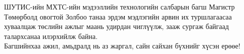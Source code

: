 
\begin{acknowledgements}
\addchaptertocentry{\acknowledgementname}

ШУТИС-ийн МХТС-ийн мэдээллийн технологийн салбарын багш Магистр Төмөрболд овогтой Золбоо танаа эрдэм мэдлэгийн арвин их туршлагаасаа хуваалцаж төслийн ажлыг маань удирдан чиглүүлж, зааж сургаж байгаад талархсанаа илэрхийлж байна.
\\Багшийнхаа ажил, амьдралд нь аз жаргал, сайн сайхан бүхнийг хүсэн ерөөе!

\end{acknowledgements}

